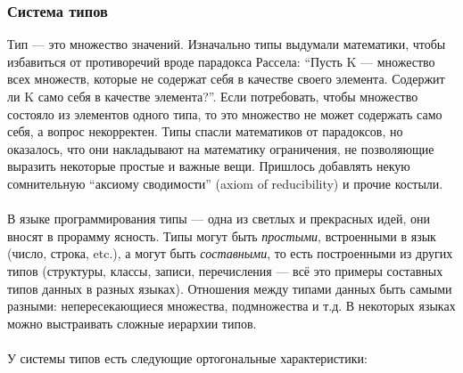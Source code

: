 \documentclass[11pt]{book}
\begin{document}
\subsubsection{Система типов}
Тип --- это множество значений.
Изначально типы выдумали математики, чтобы избавиться от противоречий вроде парадокса Рассела:
``Пусть K — множество всех множеств, которые не содержат себя в качестве своего элемента. Содержит ли K само себя в качестве элемента?''.
Если потребовать, чтобы множество состояло из элементов одного типа, то это множество не может содержать само себя,
а вопрос некорректен.
Типы спасли математиков от парадоксов, но оказалось, что они накладывают на математику ограничения,
не позволяющие выразить некоторые простые и важные вещи.
Пришлось добавлять некую сомнительную ``аксиому сводимости'' (axiom of reducibility) и прочие костыли.
\\ \\
В языке программирования типы --- одна из светлых и прекрасных идей, они вносят в прорамму ясность.
Типы могут быть \emph{простыми}, встроенными в язык (число, строка, etc.),
а могут быть \emph{составными}, то есть построенными из других типов (структуры, классы, записи, перечисления ---
всё это примеры составных типов данных в разных языках).
Отношения между типами данных быть самыми разными: непересекающиеся множества, подмножества и т.д.
В некоторых языках можно выстраивать сложные иерархии типов.
\\ \\
У системы типов есть следующие ортогональные характеристики:
\end{document}
